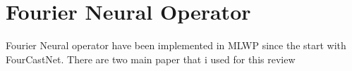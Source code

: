 \section{Fourier Neural Operator}

Fourier Neural operator have been implemented in MLWP since the start with FourCastNet. There are two main paper that i used for this review